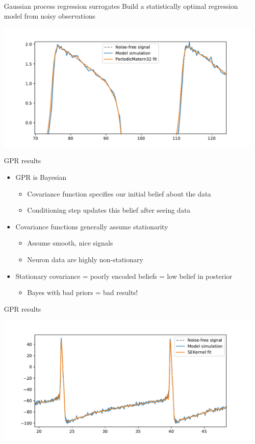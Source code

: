 \documentclass[presentation]{beamer}
\begin{document}
\begin{frame}[label={sec:org28f4d36}]{Gaussian process regression surrogates}
Build a statistically optimal regression model from noisy observations

\begin{center}
\includegraphics[width=.9\linewidth]{./matern.pdf}
\end{center}
\end{frame}

\begin{frame}[<+->][label={sec:org9950fb4}]{GPR results}
\begin{itemize}
\item GPR is Bayesian
\begin{itemize}
\item Covariance function specifies our initial belief about the data
\item Conditioning step updates this belief after seeing data
\end{itemize}
\item Covariance functions generally assume stationarity
\begin{itemize}
\item Assume smooth, nice signals
\item Neuron data are highly non-stationary
\end{itemize}
\item Stationary covariance = poorly encoded beliefs = low belief in posterior
\begin{itemize}
\item Bayes with bad priors = bad results!
\end{itemize}
\end{itemize}
\end{frame}

\begin{frame}[label={sec:org6c1e45c}]{GPR results}
\begin{center}
\includegraphics[width=.9\linewidth]{./badfit.pdf}
\end{center}
\end{frame}
\end{document}
